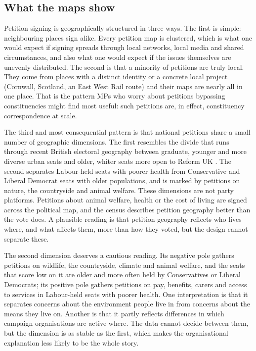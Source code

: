 \documentclass[11pt,a4paper]{article}
\begin{document}
\subsection{What the maps show}
Petition signing is geographically structured in three ways. The first is simple: neighbouring places sign alike. Every petition map is clustered, which is what one would expect if signing spreads through local networks, local media and shared circumstances, and also what one would expect if the issues themselves are unevenly distributed. The second is that a minority of petitions are truly local. They come from places with a distinct identity or a concrete local project (Cornwall, Scotland, an East West Rail route) and their maps are nearly all in one place. That is the pattern MPs who worry about petitions bypassing constituencies \citep{matthews2021} might find most useful: such petitions are, in effect, constituency correspondence at scale.

The third and most consequential pattern is that national petitions share a small number of geographic dimensions. The first resembles the divide that runs through recent British electoral geography between graduate, younger and more diverse urban seats and older, whiter seats more open to Reform UK \citep{jenningsstoker2016,goodwinheath2016,beckeretal2017}. The second separates Labour-held seats with poorer health from Conservative and Liberal Democrat seats with older populations, and is marked by petitions on nature, the countryside and animal welfare. These dimensions are not party platforms. Petitions about animal welfare, health or the cost of living are signed across the political map, and the census describes petition geography better than the vote does. A plausible reading is that petition geography reflects who lives where, and what affects them, more than how they voted, but the design cannot separate these.

The second dimension deserves a cautious reading. Its negative pole gathers petitions on wildlife, the countryside, climate and animal welfare, and the seats that score low on it are older and more often held by Conservatives or Liberal Democrats; its positive pole gathers petitions on pay, benefits, carers and access to services in Labour-held seats with poorer health. One interpretation is that it separates concerns about the environment people live in from concerns about the means they live on. Another is that it partly reflects differences in which campaign organisations are active where. The data cannot decide between them, but the dimension is as stable as the first, which makes the organisational explanation less likely to be the whole story.
\end{document}
